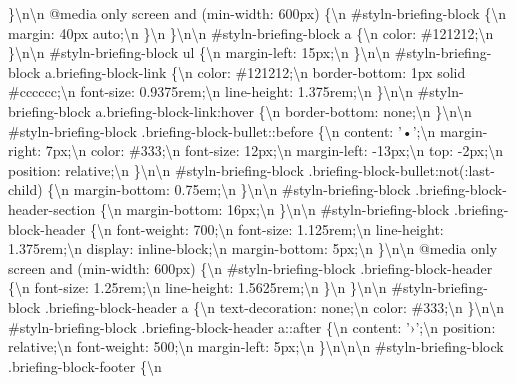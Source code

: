 \}\textbackslash{}n\textbackslash{}n @media only screen and (min-width:
600px) \{\textbackslash{}n \#styln-briefing-block \{\textbackslash{}n
margin: 40px auto;\textbackslash{}n \}\textbackslash{}n
\}\textbackslash{}n\textbackslash{}n \#styln-briefing-block a
\{\textbackslash{}n color: \#121212;\textbackslash{}n
\}\textbackslash{}n\textbackslash{}n \#styln-briefing-block ul
\{\textbackslash{}n margin-left: 15px;\textbackslash{}n
\}\textbackslash{}n\textbackslash{}n \#styln-briefing-block
a.briefing-block-link \{\textbackslash{}n color:
\#121212;\textbackslash{}n border-bottom: 1px solid
\#cccccc;\textbackslash{}n font-size: 0.9375rem;\textbackslash{}n
line-height: 1.375rem;\textbackslash{}n
\}\textbackslash{}n\textbackslash{}n \#styln-briefing-block
a.briefing-block-link:hover \{\textbackslash{}n border-bottom:
none;\textbackslash{}n \}\textbackslash{}n\textbackslash{}n
\#styln-briefing-block .briefing-block-bullet::before
\{\textbackslash{}n content: '•';\textbackslash{}n margin-right:
7px;\textbackslash{}n color: \#333;\textbackslash{}n font-size:
12px;\textbackslash{}n margin-left: -13px;\textbackslash{}n top:
-2px;\textbackslash{}n position: relative;\textbackslash{}n
\}\textbackslash{}n\textbackslash{}n \#styln-briefing-block
.briefing-block-bullet:not(:last-child) \{\textbackslash{}n
margin-bottom: 0.75em;\textbackslash{}n
\}\textbackslash{}n\textbackslash{}n \#styln-briefing-block
.briefing-block-header-section \{\textbackslash{}n margin-bottom:
16px;\textbackslash{}n \}\textbackslash{}n\textbackslash{}n
\#styln-briefing-block .briefing-block-header \{\textbackslash{}n
font-weight: 700;\textbackslash{}n font-size: 1.125rem;\textbackslash{}n
line-height: 1.375rem;\textbackslash{}n display:
inline-block;\textbackslash{}n margin-bottom: 5px;\textbackslash{}n
\}\textbackslash{}n\textbackslash{}n @media only screen and (min-width:
600px) \{\textbackslash{}n \#styln-briefing-block .briefing-block-header
\{\textbackslash{}n font-size: 1.25rem;\textbackslash{}n line-height:
1.5625rem;\textbackslash{}n \}\textbackslash{}n
\}\textbackslash{}n\textbackslash{}n \#styln-briefing-block
.briefing-block-header a \{\textbackslash{}n text-decoration:
none;\textbackslash{}n color: \#333;\textbackslash{}n
\}\textbackslash{}n\textbackslash{}n \#styln-briefing-block
.briefing-block-header a::after \{\textbackslash{}n content:
'›';\textbackslash{}n position: relative;\textbackslash{}n font-weight:
500;\textbackslash{}n margin-left: 5px;\textbackslash{}n
\}\textbackslash{}n\textbackslash{}n\textbackslash{}n
\#styln-briefing-block .briefing-block-footer \{\textbackslash{}n
